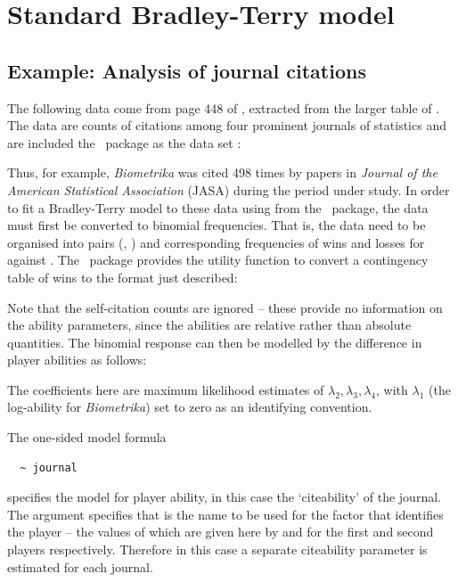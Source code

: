 \section{Standard Bradley-Terry model}
\label{sec:BTmodel}

\subsection{Example: Analysis of journal citations}
\label{citations}

The following data come from page 448 of \citet{agre:02}, extracted from the larger
table of \citet{stig:94}.  The data are counts of citations among four prominent
journals of statistics and are included the \BT\ package as the data set
:

\Rcodeplaceholder{}

\Rcodeplaceholder{}

\Rcodeplaceholder{}

Thus, for example, \emph{Biometrika} was cited 498 times by papers in
\emph{Journal of the American Statistical Association} (JASA) during the period under study.  In order to fit a Bradley-Terry
model to these data using  from the \BT\ package, the data must
first be converted to binomial frequencies. That is, the data need to be
organised into pairs (, ) and corresponding
frequencies of wins and losses for  against
. The \BT\ package provides the utility function
 to convert a contingency table of
wins to the format just described:

\Rcodeplaceholder{}

Note that the self-citation counts are ignored -- these provide no
information on the ability parameters, since the abilities are relative rather than
absolute quantities.
The binomial response can then be modelled by the difference in player abilities
as follows:

\Rcodeplaceholder{}

The coefficients here are maximum likelihood estimates of $\lambda_2, \lambda_3,
\lambda_4$, with $\lambda_1$ (the log-ability for \emph{Biometrika}) set to zero
as an identifying convention.

The one-sided model formula
\begin{verbatim}
  ~ journal
\end{verbatim}
specifies the model for player ability, in this case the `citeability' of the
journal. The  argument specifies that  is the
name to be used for the factor that identifies the player -- the values of which
are given here by  and  for the first and
second players respectively. Therefore in this case a separate
citeability parameter is estimated for each journal.


